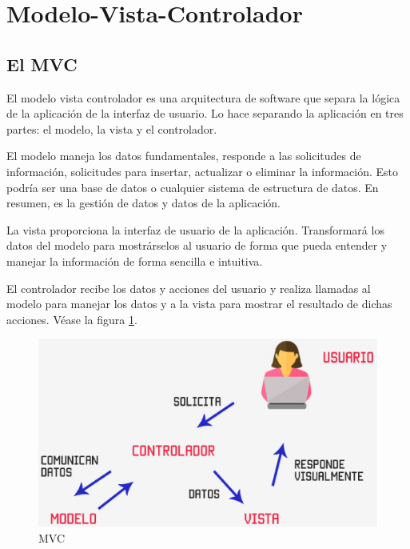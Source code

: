 \section{Modelo-Vista-Controlador}
\label{:sec3}

\subsection{El MVC}
\label{3:3:1}

El modelo vista controlador es una arquitectura de software que separa la lógica de la aplicación de la interfaz de usuario. Lo hace separando la aplicación en tres partes: el modelo, la vista y el controlador.

El modelo maneja los datos fundamentales, responde a las solicitudes de información, solicitudes para insertar, actualizar o eliminar la información. Esto podría ser una base de datos o cualquier sistema de estructura de datos. En resumen, es la gestión de datos y datos de la aplicación.

La vista proporciona la interfaz de usuario de la aplicación. Transformará los datos del modelo para mostrárselos al usuario de forma que pueda entender y manejar la información de forma sencilla e intuitiva.

El controlador recibe los datos y acciones del usuario y realiza llamadas al modelo para manejar los datos y a la vista para mostrar el resultado de dichas acciones. Véase la figura \ref{fig:MVC}.

\begin{figure}[!th]
\begin{center}
\includegraphics[scale=0.3]{images/29}
\caption{MVC}
\label{fig:MVC}
\end{center}
\end{figure}

